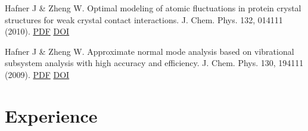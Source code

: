 \documentclass[letterpaper]{twentysecondcv} %
\begin{document}
Hafner J \& Zheng W. Optimal modeling of atomic fluctuations in protein crystal structures for weak crystal contact interactions. J. Chem. Phys. 132, 014111 (2010).
  \href{http://www.acsu.buffalo.edu/~wjzheng/Hafner_jcp2010.pdf}{PDF}
  \href{http://aip.scitation.org/doi/10.1063/1.3288503}{DOI}

Hafner J \& Zheng W. Approximate normal mode analysis based on vibrational subsystem analysis with high accuracy and efficiency. J. Chem. Phys. 130, 194111 (2009).
 \href{http://www.acsu.buffalo.edu/~wjzheng/Hafner_jcp2009.pdf}{PDF}
 \href{http://aip.scitation.org/doi/10.1063/1.3141022}{DOI}




\section{Experience}
\end{document}
